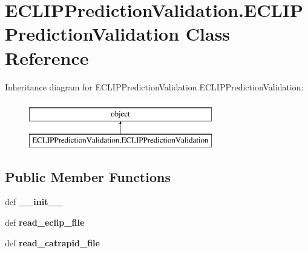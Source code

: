 \hypertarget{classECLIPPredictionValidation_1_1ECLIPPredictionValidation}{\section{E\-C\-L\-I\-P\-Prediction\-Validation.\-E\-C\-L\-I\-P\-Prediction\-Validation Class Reference}
\label{classECLIPPredictionValidation_1_1ECLIPPredictionValidation}
}
Inheritance diagram for E\-C\-L\-I\-P\-Prediction\-Validation.\-E\-C\-L\-I\-P\-Prediction\-Validation\-:\begin{figure}[H]
\begin{center}
\leavevmode
\includegraphics[height=2.000000cm]{classECLIPPredictionValidation_1_1ECLIPPredictionValidation}
\end{center}
\end{figure}
\subsection*{Public Member Functions}
\begin{DoxyCompactItemize}
\item 
\hypertarget{classECLIPPredictionValidation_1_1ECLIPPredictionValidation_aa57c31f655660ae5f4fc129d1e9aef06}{def {\bfseries \-\_\-\-\_\-init\-\_\-\-\_\-}}\label{classECLIPPredictionValidation_1_1ECLIPPredictionValidation_aa57c31f655660ae5f4fc129d1e9aef06}

\item 
\hypertarget{classECLIPPredictionValidation_1_1ECLIPPredictionValidation_a1533429475fb477e4f91b0b8bc8ed832}{def {\bfseries read\-\_\-eclip\-\_\-file}}\label{classECLIPPredictionValidation_1_1ECLIPPredictionValidation_a1533429475fb477e4f91b0b8bc8ed832}

\item 
\hypertarget{classECLIPPredictionValidation_1_1ECLIPPredictionValidation_af30c5de1c6e5381ff9bd6c5a4e5de979}{def {\bfseries read\-\_\-catrapid\-\_\-file}}\label{classECLIPPredictionValidation_1_1ECLIPPredictionValidation_af30c5de1c6e5381ff9bd6c5a4e5de979}

\end{DoxyCompactItemize}
